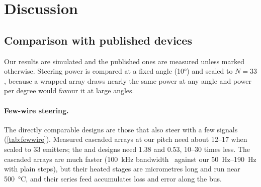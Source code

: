 \section{Discussion}
\label{sec:discussion}

\subsection{Comparison with published devices}
\label{sec:compare}

Our results are simulated and the published ones are measured unless marked otherwise. Steering power is compared at
a fixed angle (\ang{10}) and scaled to $N=33$, because a wrapped array draws nearly the same power at any angle and
power per degree would favour it at large angles.

\paragraph{Few-wire steering.} The directly comparable designs are those that also steer with a few signals
(\cref{tab:fewwire}). Measured cascaded arrays at our pitch need about \qtyrange{12}{17}{\mWdeg} when scaled to
\num{33} emitters; the  and  designs need \num{1.38} and \qty{0.53}{\mWdeg},
\numrange{10}{30} times less. The cascaded arrays are much faster (\qty{100}{\kilo\hertz} bandwidth~\cite{yaacobi2014}
against our \qtyrange{50}{190}{\hertz} with plain steps), but their heated stages are micrometres long and run near
\qty{500}{\celsius}, and their series feed accumulates loss and error along the bus.

